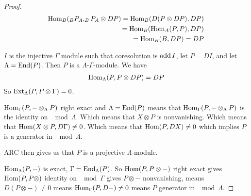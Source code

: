 \begin{theorem}
	\begin{proof}
		\begin{align*}
			\operatorname{Hom}_B(_BP_A, _BP_A\otimes DP) = \operatorname{Hom}_B(D(P\otimes DP), DP)\\
			= \operatorname{Hom}_B(\operatorname{Hom}_A(P, P), DP)\\
			= \operatorname{Hom}_B(B, DP) = DP
		\end{align*}
		
		$I$ is the injective $\Gamma$ module such that coresolution is $\operatorname{add} I$, let $P = DI$, and let $\Lambda = \operatorname{End}(P)$. Then $P$ is a $\Lambda$-$\Gamma$-module. We have 
		\begin{align*}
			\operatorname{Hom}_\Lambda(P, P\otimes DP) = DP
		\end{align*}
		So $\operatorname{Ext}_\Lambda(P, P\otimes \Gamma) = 0$. 
		
		$\operatorname{Hom}_\Gamma(P, -\otimes_\Lambda P)$ right exact and $\Lambda = \operatorname{End}(P)$ means that $\operatorname{Hom}_\Gamma(P, -\otimes_\Lambda P)$ is the identity on $\mod\Lambda$. Which means that $X\otimes P$ is nonvanishing. Which means that $\operatorname{Hom}(X \otimes P, D\Gamma) \neq 0$. Which means that $\operatorname{Hom}(P, DX) \neq 0$ which implies $P$ is a generator in $\mod\Lambda$.
		
		ARC then gives us that $P$ is a projective $\Lambda$-module.
		
		$\operatorname{Hom}_\Lambda(P, -)$ is exact, $\Gamma = \operatorname{End}_\Lambda(P)$. So $\operatorname{Hom}(P, P\otimes -)$ right exact gives $\operatorname{Hom}(P, P\otimes)$ identity on $\mod\Gamma$ gives $P\otimes -$ nonvanishing, means $D(P\otimes -) \neq 0$ means $\operatorname{Hom}_\Gamma(P, D-) \neq 0$ means $P$ generator in $\mod\Lambda$.
	\end{proof}
\end{theorem}

